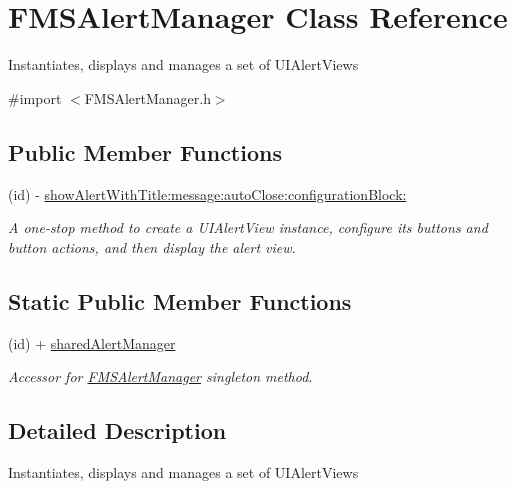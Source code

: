 \hypertarget{interface_f_m_s_alert_manager}{\section{F\-M\-S\-Alert\-Manager Class Reference}
\label{interface_f_m_s_alert_manager}
}


Instantiates, displays and manages a set of {\ttfamily U\-I\-Alert\-Views}  




{\ttfamily \#import $<$F\-M\-S\-Alert\-Manager.\-h$>$}

\subsection*{Public Member Functions}
\begin{DoxyCompactItemize}
\item 
(id) -\/ \hyperlink{interface_f_m_s_alert_manager_ada5d8100da27812849c0e5fe8725b14f}{show\-Alert\-With\-Title\-:message\-:auto\-Close\-:configuration\-Block\-:}
\begin{DoxyCompactList}\small\item\em A one-\/stop method to create a {\ttfamily U\-I\-Alert\-View} instance, configure its buttons and button actions, and then display the alert view. \end{DoxyCompactList}\end{DoxyCompactItemize}
\subsection*{Static Public Member Functions}
\begin{DoxyCompactItemize}
\item 
(id) + \hyperlink{interface_f_m_s_alert_manager_aa427130ba8302c751f1712c45a10ce5e}{shared\-Alert\-Manager}
\begin{DoxyCompactList}\small\item\em Accessor for {\ttfamily \hyperlink{interface_f_m_s_alert_manager}{F\-M\-S\-Alert\-Manager}} singleton method. \end{DoxyCompactList}\end{DoxyCompactItemize}


\subsection{Detailed Description}
Instantiates, displays and manages a set of {\ttfamily U\-I\-Alert\-Views} 

